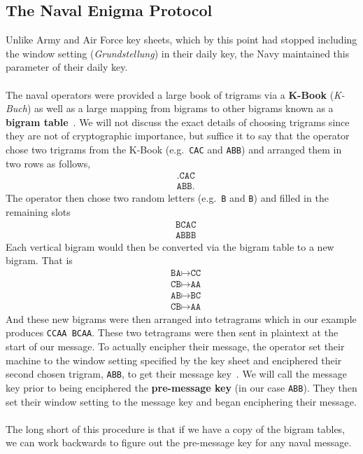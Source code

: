 \subsection{The Naval Enigma Protocol}
Unlike Army and Air Force key sheets, which by this point had stopped
including the window setting (\emph{Grundstellung}) in their daily
key, the Navy maintained this parameter of their daily key.
\\\\The naval operators were provided a large book of trigrams via a
{\bf{{K-Book}}} (\emph{K-Buch}) as well as a large mapping from
bigrams to other bigrams known as a {\bf{bigram table}}~\cite[pp.~332,334]{rijmenants2010enigma}. We will not
discuss the exact details of choosing trigrams since they are not of
cryptographic importance, but suffice it to say that the operator
chose two trigrams from the K-Book (e.g.\ \texttt{CAC} and
\texttt{ABB}) and arranged them in two rows as follows,
\begin{align*}
  & \texttt{.CAC} \\
  & \texttt{ABB.}
\end{align*}
The operator then chose two random letters (e.g.\ \texttt{B} and
\texttt{B}) and filled in the remaining slots
\begin{align*}
  & \texttt{BCAC} \\
  & \texttt{ABBB}
\end{align*}
Each vertical bigram would then be converted via the bigram table to
a new bigram. That is
\begin{align*}
  & \texttt{BA} \mapsto \texttt{CC} \\
  & \texttt{CB} \mapsto \texttt{AA} \\
  & \texttt{AB} \mapsto \texttt{BC} \\
  & \texttt{CB} \mapsto \texttt{AA}
\end{align*}
And these new bigrams were then arranged into tetragrams which in our
example produces \texttt{CCAA BCAA}. These two tetragrams were then
sent in plaintext at the start of our message. To actually encipher
their message, the operator set their machine to the window setting
specified by the key sheet and enciphered their second chosen
trigram, \texttt{ABB}, to get their message key~\cite[pp.~332--336]{rijmenants2010enigma}. We will call the message
key prior to being enciphered the {\bf{pre-message key}} (in our
case \texttt{ABB}). They then set their window setting to the
message key and began enciphering their message.
\\\\The long short of this procedure is that if we have a copy of
the bigram tables, we can work backwards to figure out the
pre-message key for any naval message.
